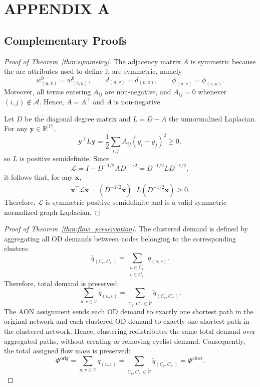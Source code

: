 \documentclass[lettersize,journal]{IEEEtran}
\begin{document}
\section*{APPENDIX A}
\subsection*{Complementary Proofs}

\begin{proof}[Proof of Theorem~\ref{thm:symmetry}]
The adjacency matrix $A$ is symmetric because the arc attributes used to define
it are symmetric, namely
\[
w_{(u,v)}^0=w_{(v,u)}^0,\qquad
d_{(u,v)}=d_{(v,u)},\qquad
\phi_{(u,v)}=\phi_{(v,u)}.
\]
Moreover, all terms entering $A_{ij}$ are non-negative, and $A_{ij}=0$ whenever
$(i,j)\notin\mathcal{A}$. Hence, $A=A^\top$ and $A$ is non-negative.

Let $D$ be the diagonal degree matrix and $L=D-A$ the unnormalized Laplacian.
For any $\mathbf{y}\in\mathbb{R}^{|\mathcal{V}|}$,
\[
\mathbf{y}^{\top}L\mathbf{y}
=
\frac{1}{2}
\sum_{i,j}A_{ij}(y_i-y_j)^2
\geq 0,
\]
so $L$ is positive semidefinite. Since
\[
\mathcal{L}
=
I-D^{-1/2}AD^{-1/2}
=
D^{-1/2}LD^{-1/2},
\]
it follows that, for any $\mathbf{x}$,
\[
\mathbf{x}^{\top}\mathcal{L}\mathbf{x}
=
(D^{-1/2}\mathbf{x})^{\top}
L
(D^{-1/2}\mathbf{x})
\geq 0.
\]
Therefore, $\mathcal{L}$ is symmetric positive semidefinite and is a valid
symmetric normalized graph Laplacian.
\end{proof}

\begin{proof}[Proof of Theorem~\ref{thm:flow_preservation}]
The clustered demand is defined by aggregating all OD demands between nodes
belonging to the corresponding clusters:
\[
\tilde{q}_{(C_r,C_{r'})}
=
\sum_{\substack{u\in C_r\\ v\in C_{r'}}}
q_{(u,v)}.
\]
Therefore, total demand is preserved:
\[
\sum_{u,v\in\mathcal{V}}q_{(u,v)}
=
\sum_{C_r,C_{r'}\in\tilde{\mathcal{V}}}
\tilde{q}_{(C_r,C_{r'})}.
\]
The AON assignment sends each OD demand to exactly one shortest path in the
original network and each clustered OD demand to exactly one shortest path in
the clustered network. Hence, clustering redistributes the same total demand
over aggregated paths, without creating or removing cyclist demand. Consequently,
the total assigned flow mass is preserved:
\[
\Phi^{\mathrm{orig}}
=
\sum_{u,v\in\mathcal{V}}q_{(u,v)}
=
\sum_{C_r,C_{r'}\in\tilde{\mathcal{V}}}
\tilde{q}_{(C_r,C_{r'})}
=
\Phi^{\mathrm{clust}}.
\]
\end{proof}
\end{document}
